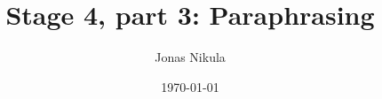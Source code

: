 \documentclass{article}
\title{Stage 4, part 3: Paraphrasing} %
\author{Jonas Nikula} %
\date{\today} %
\begin{document}
\maketitle %





\printbibliography{}

\end{document}
